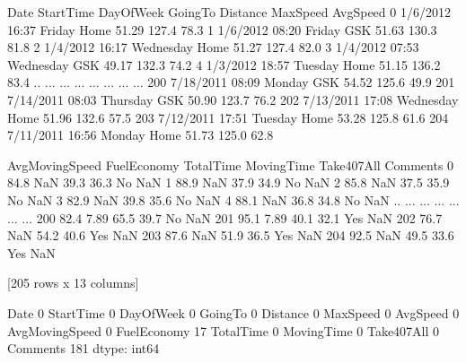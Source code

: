 \documentclass[letterpaper,10pt,english]{jupyterBook}
\begin{document}
\begin{sphinxVerbatim}[commandchars=\\\{\}]
          Date StartTime  DayOfWeek GoingTo  Distance  MaxSpeed  AvgSpeed  \PYGZbs{}
0     1/6/2012     16:37     Friday    Home     51.29     127.4      78.3   
1     1/6/2012     08:20     Friday     GSK     51.63     130.3      81.8   
2     1/4/2012     16:17  Wednesday    Home     51.27     127.4      82.0   
3     1/4/2012     07:53  Wednesday     GSK     49.17     132.3      74.2   
4     1/3/2012     18:57    Tuesday    Home     51.15     136.2      83.4   
..         ...       ...        ...     ...       ...       ...       ...   
200  7/18/2011     08:09     Monday     GSK     54.52     125.6      49.9   
201  7/14/2011     08:03   Thursday     GSK     50.90     123.7      76.2   
202  7/13/2011     17:08  Wednesday    Home     51.96     132.6      57.5   
203  7/12/2011     17:51    Tuesday    Home     53.28     125.8      61.6   
204  7/11/2011     16:56     Monday    Home     51.73     125.0      62.8   

     AvgMovingSpeed FuelEconomy  TotalTime  MovingTime Take407All Comments  
0              84.8         NaN       39.3        36.3         No      NaN  
1              88.9         NaN       37.9        34.9         No      NaN  
2              85.8         NaN       37.5        35.9         No      NaN  
3              82.9         NaN       39.8        35.6         No      NaN  
4              88.1         NaN       36.8        34.8         No      NaN  
..              ...         ...        ...         ...        ...      ...  
200            82.4        7.89       65.5        39.7         No      NaN  
201            95.1        7.89       40.1        32.1        Yes      NaN  
202            76.7         NaN       54.2        40.6        Yes      NaN  
203            87.6         NaN       51.9        36.5        Yes      NaN  
204            92.5         NaN       49.5        33.6        Yes      NaN  

[205 rows x 13 columns]
\end{sphinxVerbatim}

\begin{sphinxVerbatim}[commandchars=\\\{\}]
\end{sphinxVerbatim}

\begin{sphinxVerbatim}[commandchars=\\\{\}]
Date                0
StartTime           0
DayOfWeek           0
GoingTo             0
Distance            0
MaxSpeed            0
AvgSpeed            0
AvgMovingSpeed      0
FuelEconomy        17
TotalTime           0
MovingTime          0
Take407All          0
Comments          181
dtype: int64
\end{sphinxVerbatim}
\end{document}
